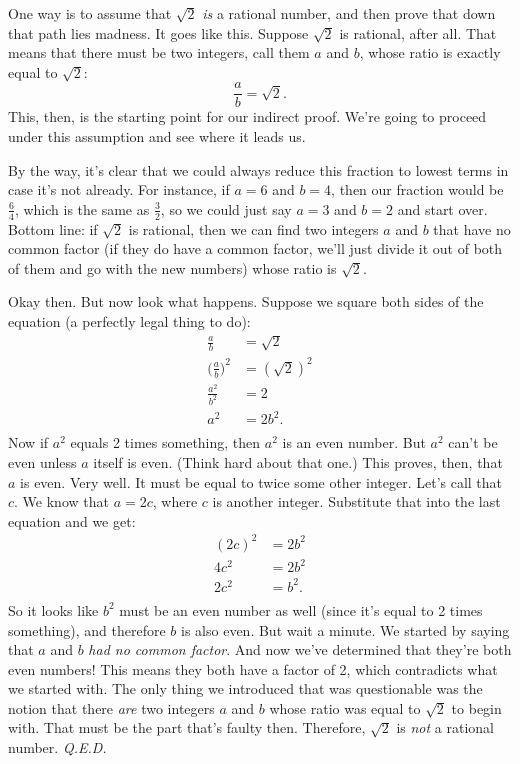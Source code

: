 One way is to assume that $\sqrt{2}$ \textit{is} a rational number, and
then prove that down that path lies madness. It goes like this. Suppose
$\sqrt{2}$ is rational, after all. That means that there must be two
integers, call them $a$ and $b$, whose ratio is exactly equal to
$\sqrt{2}$:
\[
\frac{a}{b} = \sqrt{2}.
\]
This, then, is the starting point for our indirect proof. We're going to
proceed under this assumption and see where it leads us.

By the way, it's clear that we could always reduce this fraction to lowest
terms in case it's not already. For instance, if $a=6$ and $b=4$, then our
fraction would be $\frac{6}{4}$, which is the same as $\frac{3}{2}$, so we
could just say $a=3$ and $b=2$ and start over. Bottom line: if $\sqrt{2}$
is rational, then we can find two integers $a$ and $b$ that have no common
factor (if they do have a common factor, we'll just divide it out of both
of them and go with the new numbers) whose ratio is $\sqrt{2}$.

Okay then. But now look what happens. Suppose we square both sides of the
equation (a perfectly legal thing to do):
\begin{align*}
\frac{a}{b} &= \sqrt{2} \\
\Bigg(\frac{a}{b}\Bigg)^2 &= (\sqrt{2})^2 \\
\frac{a^2}{b^2} &= 2 \\
a^2 &= 2{b^2}. \\
\end{align*}
Now if $a^2$ equals 2 times something, then $a^2$ is an even number. But
$a^2$ can't be even unless $a$ itself is even. (Think hard about that one.)
This proves, then, that $a$ is even. Very well. It must be equal to twice
some other integer. Let's call that $c$. We know that $a=2c$, where $c$ is
another integer. Substitute that into the last equation and we get:
\begin{align*}
(2c)^2 &= 2{b^2} \\
4c^2 &= 2{b^2} \\
2c^2 &= b^2. \\
\end{align*}
So it looks like $b^2$ must be an even number as well (since it's equal to
2 times something), and therefore $b$ is also even. But wait a minute. We
started by saying that $a$ and $b$ \textit{had no common factor}. And now
we've determined that they're both even numbers! This means they both have
a factor of 2, which contradicts what we started with. The only thing we
introduced that was questionable was the notion that there \textit{are} two
integers $a$ and $b$ whose ratio was equal to $\sqrt{2}$ to begin with.
That must be the part that's faulty then. Therefore, $\sqrt{2}$ is
\textit{not} a rational number. \textit{Q.E.D.}

